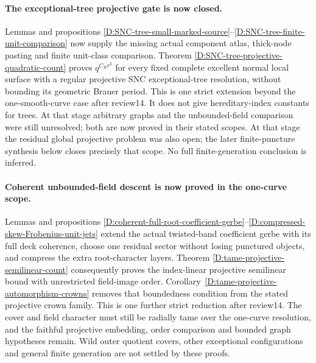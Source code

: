 \paragraph{The exceptional-tree projective gate is now closed.}
Lemmas and propositions
\ref{D:SNC-tree-small-marked-source}--\ref{D:SNC-tree-finite-unit-comparison}
now supply the missing actual component atlas, thick-node pasting and
finite unit-class comparison. Theorem
\ref{D:SNC-tree-projective-quadratic-count} proves
$q^{C_Rr^2}$ for every fixed complete excellent normal local surface
with a regular projective SNC exceptional-tree resolution, without
bounding its geometric Brauer period. This is one strict extension
beyond the one-smooth-curve case after review14. It does not give
hereditary-index constants for trees. At that stage arbitrary graphs and the unbounded-field comparison
were still unresolved; both are now proved in their stated scopes.
At that stage the residual global projective problem was also open;
the later finite-puncture synthesis below closes precisely that scope.
No full finite-generation conclusion is inferred.


\paragraph{Coherent unbounded-field descent is now proved in the one-curve scope.}
Lemmas and propositions
\ref{D:coherent-full-root-coefficient-gerbe}--\ref{D:compressed-skew-Frobenius-unit-jets}
extend the actual twisted-band coefficient gerbe with its full deck
coherence, choose one residual sector without losing punctured objects,
and compress the extra root-character layers. Theorem
\ref{D:tame-projective-semilinear-count} consequently proves the
index-linear projective semilinear bound with unrestricted field-image
order. Corollary~\ref{D:tame-projective-automorphism-crowns} removes
that boundedness condition from the stated projective crown family.
This is one further strict reduction after review14. The cover and
field character must still be radially tame over the one-curve
resolution, and the faithful projective embedding, order comparison
and bounded graph hypotheses remain. Wild outer quotient covers,
other exceptional configurations and general finite generation are
not settled by these proofs.



